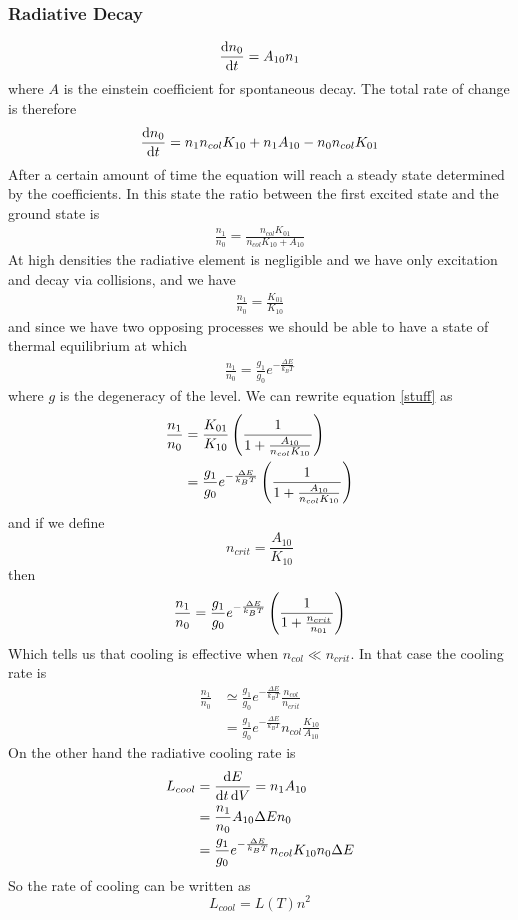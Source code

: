 \subsubsection{Radiative Decay}
\begin{align}
    \diff{n_0}{t} = A_{10} n_1
\end{align}
where \(A\) is the einstein coefficient for spontaneous decay. The total rate of change is therefore
\begin{align}
    \diff{n_0}{t} = n_1 n_{col} K_{10} + n_1 A_{10} - n_0 n_{col} K_{01}
\end{align}
After a certain amount of time the equation will reach a steady state determined by the coefficients. In this state the ratio between the first excited state and the ground state is
\begin{align}\label{stuff}
    \frac{n_1}{n_0} = \frac{n_{col} K_{01}}{n_{col}K_{10} +A_{10}}
\end{align}
At high densities the radiative element is negligible and we have only excitation and decay via collisions, and we have
\begin{align}
    \frac{n_1}{n_0} = \frac{K_{01}}{K_{10}}
\end{align}
and since we have two opposing processes we should be able to have a state of thermal equilibrium at which
\begin{align}
    \frac{n_1}{n_0} = \frac{g_1}{g_0}e^{-\frac{\Delta E}{k_B T}}
\end{align}
where \(g\) is the degeneracy of the level. We can rewrite equation \ref{stuff} as
\begin{align}
    \frac{n_1}{n_0} &= \frac{K_{01}}{K_{10}}\left(\frac{1}{1+\frac{A_{10}}{n_{col}K_{10}}}\right)\\
    &= \frac{g_1}{g_0}e^{-\frac{\Delta E}{k_B T}}\left(\frac{1}{1+\frac{A_{10}}{n_{col}K_{10}}}\right)
\end{align}
and if we define
\begin{equation}
    n_{crit} = \frac{A_{10}}{K_{10}}
\end{equation}
then
\begin{equation}
    \frac{n_1}{n_0} = \frac{g_1}{g_0}e^{-\frac{\Delta E}{k_B T}} \left(\frac{1}{1+\frac{n_{crit}}{n_{01}}}\right)
\end{equation}
Which tells us that cooling is effective when \(n_{col} \ll n_{crit}\). In that case the cooling rate is
\begin{align}
    \frac{n_1}{n_0} &\simeq \frac{g_1}{g_0}e^{-\frac{\Delta E}{k_B T}}\frac{n_{col}}{n_{crit}} \\
    &= \frac{g_1}{g_0}e^{-\frac{\Delta E}{k_B T}}n_{col} \frac{K_{10}}{A_{10}}
\end{align}
On the other hand the radiative cooling rate is
\begin{align}
    L_{cool} &= \diff{E}{t\dd V} = n_1 A_{10}\\
    &= \frac{n_1}{n_0} A_{10} \Delta E n_0\\
    &= \frac{g_1}{g_0}e^{-\frac{\Delta E}{k_B T}} n_{col} K_{10} n_0 \Delta E
\end{align}
So the rate of cooling can be written as
\begin{equation}
    L_{cool} = L(T)n^2
\end{equation}
